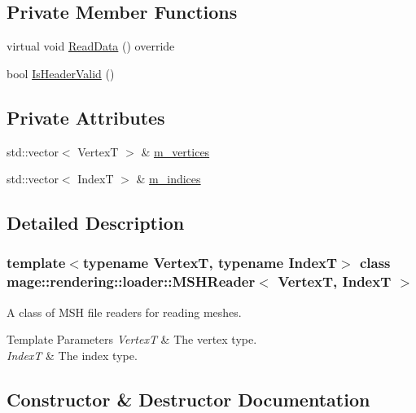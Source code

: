 \subsection*{Private Member Functions}
\begin{DoxyCompactItemize}
\item 
virtual void \hyperlink{classmage_1_1rendering_1_1loader_1_1_m_s_h_reader_a99e8e3c50decb9332dc10bcdf7b6e00a}{Read\+Data} () override
\item 
bool \hyperlink{classmage_1_1rendering_1_1loader_1_1_m_s_h_reader_a7e6948dfb5f5c672719ebe10c4dae6bf}{Is\+Header\+Valid} ()
\end{DoxyCompactItemize}
\subsection*{Private Attributes}
\begin{DoxyCompactItemize}
\item 
std\+::vector$<$ VertexT $>$ \& \hyperlink{classmage_1_1rendering_1_1loader_1_1_m_s_h_reader_a57e5f4e14aecbce999df14d0dcaba4e5}{m\+\_\+vertices}
\item 
std\+::vector$<$ IndexT $>$ \& \hyperlink{classmage_1_1rendering_1_1loader_1_1_m_s_h_reader_acf3ae948f5bb927a167bbb2e5d618916}{m\+\_\+indices}
\end{DoxyCompactItemize}


\subsection{Detailed Description}
\subsubsection*{template$<$typename VertexT, typename IndexT$>$\newline
class mage\+::rendering\+::loader\+::\+M\+S\+H\+Reader$<$ Vertex\+T, Index\+T $>$}

A class of M\+SH file readers for reading meshes.


\begin{DoxyTemplParams}{Template Parameters}
{\em VertexT} & The vertex type. \\
\hline
{\em IndexT} & The index type. \\
\hline
\end{DoxyTemplParams}


\subsection{Constructor \& Destructor Documentation}
\hypertarget{classmage_1_1rendering_1_1loader_1_1_m_s_h_reader_adf50a71f368cd580433b3dab5ea3a1ac}{}\label{classmage_1_1rendering_1_1loader_1_1_m_s_h_reader_adf50a71f368cd580433b3dab5ea3a1ac} 
